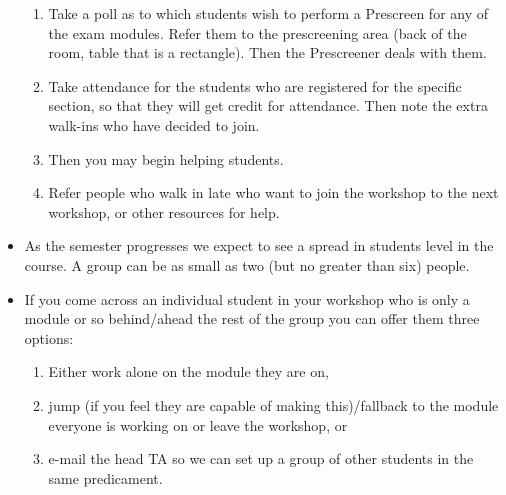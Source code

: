 \documentclass[11pt]{article}
\begin{document}
\begin{itemize}
\begin{enumerate}
		\item Take a poll as to which students wish to perform a Prescreen for any of the exam modules. Refer them to the prescreening area (back of the room, table that is a rectangle). Then the Prescreener deals with them.
		\item Take attendance for the students who are registered for the specific section, so that they will get credit for attendance. Then note the extra walk-ins who have decided to join.
		\item Then you may begin helping students.
		\item Refer people who walk in late who want to join the workshop to the next workshop, or other resources for help.
	\end{enumerate} 
	\item As the semester progresses we expect to see a spread in students level in the course. A group can be as small as two (but no greater than six) people. 
	\item If you come across an individual student in your workshop who is only a module or so behind/ahead the rest of the group you can offer them three options: 
	\begin{enumerate}
		\item Either work alone on the module they are on, 
		\item jump (if you feel they are capable of making this)/fallback to the module everyone is working on or leave the workshop, or
		\item e-mail the head TA so we can set up a group of other students in the same predicament.
	\end{enumerate}
\end{itemize}

\setlength{\headheight}{15pt}
\end{document}

